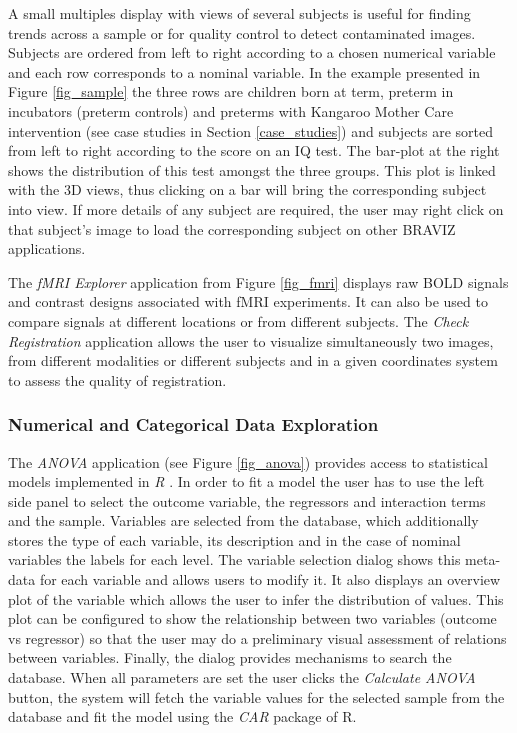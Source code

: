 \documentclass{frontiersHLTH}
\begin{document}
A small multiples display \cite{tufte_visual_1983} with views  of several subjects is useful for finding trends across a sample or for quality control to detect contaminated images. Subjects are ordered from left to right according to a chosen numerical variable and each row corresponds to a nominal variable. In the example presented in Figure \ref{fig_sample} the three rows are children born at term, preterm in incubators (preterm controls) and preterms with Kangaroo Mother Care intervention (see case studies in Section \ref{case_studies}) and subjects are sorted from left to right according to the score on an IQ test. The bar-plot at the right shows the distribution of this test amongst the three groups. This plot is linked with the 3D views, thus clicking on a bar will bring the corresponding subject into view. If more details of any subject are required, the user may right click on that subject’s image to load the corresponding subject on other BRAVIZ applications.

The \emph{fMRI Explorer} application from Figure \ref{fig_fmri} displays raw BOLD signals and contrast designs associated with fMRI experiments. It can also be used to compare signals at different locations or from different subjects. The \emph{Check Registration} application allows the user to visualize simultaneously two images, from different modalities or different subjects and in a given coordinates system to assess the quality of registration.

\subsubsection{Numerical and Categorical Data Exploration}

The \emph{ANOVA} application (see Figure \ref{fig_anova}) provides access to statistical models implemented in \emph{R} \cite{team_r:_2012}. In order to fit a model the user has to use the left side panel to select the outcome variable, the regressors and interaction terms and the sample.
Variables are selected from the database, which additionally stores the type of each variable, its description and in the case of nominal variables the labels for each level. The variable selection dialog shows this meta-data for each variable and allows users to modify it. It also displays an overview plot of the variable which allows the user to infer the distribution of values. This plot can be configured to show the relationship between two variables (outcome vs regressor) so that the user may do a preliminary visual assessment of relations between variables. Finally, the dialog provides mechanisms to search the database. When all parameters are set the user clicks the \emph{Calculate ANOVA} button, the system will fetch the variable values for the selected sample from the database and fit the model using the \emph{CAR} package of R. 
\end{document}
